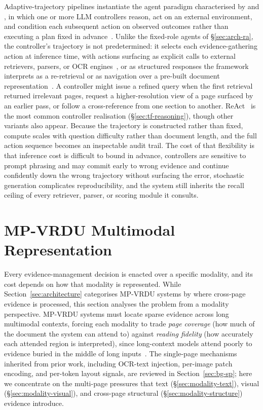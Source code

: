 Adaptive-trajectory pipelines instantiate the agent paradigm characterised by \citet{plaat2025agentic} and \citet{wang2024survey}, in which one or more LLM controllers reason, act on an external environment, and condition each subsequent action on observed outcomes rather than executing a plan fixed in advance~\cite{zheng2026doc, sun2025docagent}. Unlike the fixed-role agents of \S\ref{sec:arch-ra}, the controller's trajectory is not predetermined: it selects each evidence-gathering action at inference time, with actions surfacing as explicit calls to external retrievers, parsers, or OCR engines~\cite{wang2025vidorag, yu2025visual}, or as structured responses the framework interprets as a re-retrieval or as navigation over a pre-built document representation~\cite{jain2025simpledoc}. A controller might issue a refined query when the first retrieval returned irrelevant pages, request a higher-resolution view of a page surfaced by an earlier pass, or follow a cross-reference from one section to another. ReAct~\cite{yao2023react} is the most common controller realisation (\S\ref{sec:tf-reasoning}), though other variants also appear. Because the trajectory is constructed rather than fixed, compute scales with question difficulty rather than document length, and the full action sequence becomes an inspectable audit trail. The cost of that flexibility is that inference cost is difficult to bound in advance, controllers are sensitive to prompt phrasing and may commit early to wrong evidence and continue confidently down the wrong trajectory without surfacing the error, stochastic generation complicates reproducibility, and the system still inherits the recall ceiling of every retriever, parser, or scoring module it consults.

\section{MP-VRDU Multimodal Representation}
\label{sec:modality}

Every evidence-management decision is enacted over a specific modality, and its cost depends on how that modality is represented. While Section~\ref{sec:architecture} categorises MP-VRDU systems by where cross-page evidence is processed, this section analyses the problem from a modality perspective. MP-VRDU systems must locate sparse evidence across long multimodal contexts, forcing each modality to trade \emph{page coverage} (how much of the document the system can attend to) against \emph{reading fidelity} (how accurately each attended region is interpreted), since long-context models attend poorly to evidence buried in the middle of long inputs~\cite{liu2024lost}. The single-page mechanisms inherited from prior work, including OCR-text injection, per-image patch encoding, and per-token layout signals, are reviewed in Section~\ref{sec:bg-sp}; here we concentrate on the multi-page pressures that text (\S\ref{sec:modality-text}), visual (\S\ref{sec:modality-visual}), and cross-page structural (\S\ref{sec:modality-structure}) evidence introduce.

